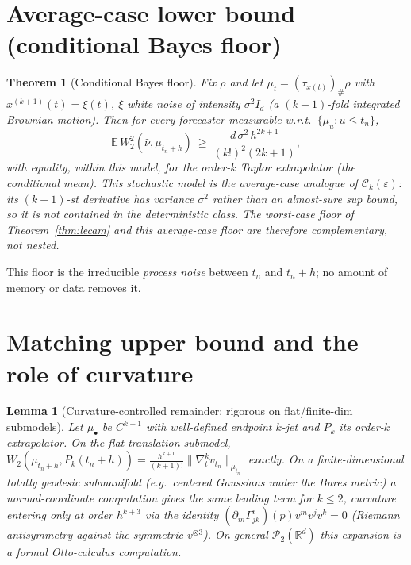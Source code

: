 \documentclass[11pt]{article}
\newtheorem{theorem}{Theorem}
\newtheorem{lemma}{Lemma}
\theoremstyle{definition}
\theoremstyle{remark}
\newcommand{\R}{\mathbb{R}}
\newcommand{\E}{\mathbb{E}}
\newcommand{\PP}{\mathcal{P}_2(\R^d)}
\newcommand{\Ck}{\mathcal{C}_k(\varepsilon)}
\begin{document}
\section{Average-case lower bound (conditional Bayes floor)}

\begin{theorem}[Conditional Bayes floor]\label{thm:bayes}
Fix $\rho$ and let $\mu_t=(\tau_{x(t)})_\#\rho$ with $x^{(k+1)}(t)=\xi(t)$, $\xi$ white
noise of intensity $\sigma^2 I_d$ (a $(k{+}1)$-fold integrated Brownian motion). Then
for every forecaster measurable w.r.t.\ $\{\mu_u:u\le t_n\}$,
\[
   \E\, W_2^2(\hat\nu,\mu_{t_n+h})\ \ge\ \frac{d\,\sigma^2\,h^{2k+1}}{(k!)^2(2k+1)},
\]
with equality, within this model, for the order-$k$ Taylor extrapolator (the
conditional mean). This stochastic model is the \emph{average-case analogue} of $\Ck$: its $(k{+}1)$-st
derivative has \emph{variance} $\sigma^2$ rather than an almost-sure sup bound, so it is not
contained in the deterministic class. The worst-case floor of Theorem~\ref{thm:lecam} and this
average-case floor are therefore complementary, not nested.
\end{theorem}

This floor is the irreducible \emph{process noise} between $t_n$ and $t_n+h$; no amount
of memory or data removes it.

\section{Matching upper bound and the role of curvature}

\begin{lemma}[Curvature-controlled remainder; rigorous on flat/finite-dim submodels]
\label{lem:curv}
Let $\mu_\bullet$ be $C^{k+1}$ with well-defined endpoint $k$-jet and $P_k$ its order-$k$
extrapolator. On the flat translation submodel,
$W_2(\mu_{t_n+h},P_k(t_n+h))=\frac{h^{k+1}}{(k+1)!}\|\nabla_t^{k}v_{t_n}\|_{\mu_{t_n}}$
exactly. On a finite-dimensional totally geodesic submanifold (e.g.\ centered Gaussians
under the Bures metric) a normal-coordinate computation gives the same leading term for
$k\le 2$, curvature entering only at order $h^{k+3}$ via the identity
$(\partial_m\Gamma^i_{jk})(p)v^mv^jv^k=0$ (Riemann antisymmetry against the symmetric
$v^{\otimes3}$). On general $\PP$ this expansion is a \emph{formal} Otto-calculus
computation.
\end{lemma}
\end{document}

